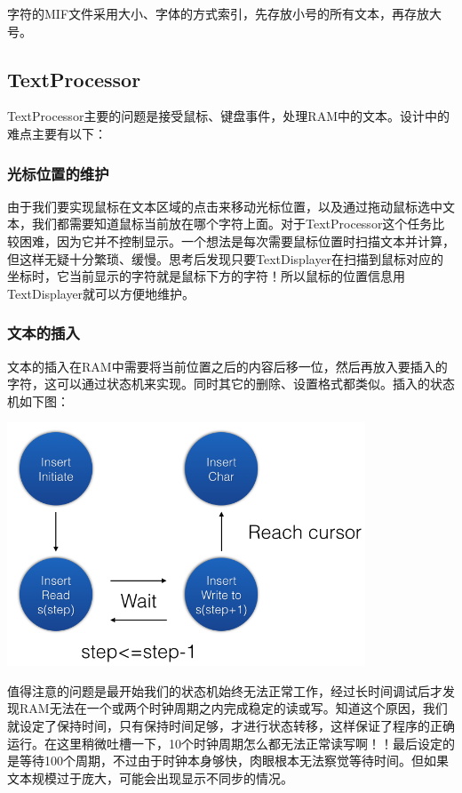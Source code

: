 \documentclass[12pt,a4paper]{article}
\begin{document}
字符的MIF文件采用大小、字体的方式索引，先存放小号的所有文本，再存放大号。


\subsection{TextProcessor}
TextProcessor主要的问题是接受鼠标、键盘事件，处理RAM中的文本。设计中的难点主要有以下：

\subsubsection{光标位置的维护}
由于我们要实现鼠标在文本区域的点击来移动光标位置，以及通过拖动鼠标选中文本，我们都需要知道鼠标当前放在哪个字符上面。对于TextProcessor这个任务比较困难，因为它并不控制显示。一个想法是每次需要鼠标位置时扫描文本并计算，但这样无疑十分繁琐、缓慢。思考后发现只要TextDisplayer在扫描到鼠标对应的坐标时，它当前显示的字符就是鼠标下方的字符！所以鼠标的位置信息用TextDisplayer就可以方便地维护。

\subsubsection{文本的插入}
文本的插入在RAM中需要将当前位置之后的内容后移一位，然后再放入要插入的字符，这可以通过状态机来实现。同时其它的删除、设置格式都类似。插入的状态机如下图：

\includegraphics[width=0.8\textwidth]{wordpad2.png}

值得注意的问题是最开始我们的状态机始终无法正常工作，经过长时间调试后才发现RAM无法在一个或两个时钟周期之内完成稳定的读或写。知道这个原因，我们就设定了保持时间，只有保持时间足够，才进行状态转移，这样保证了程序的正确运行。在这里稍微吐槽一下，10个时钟周期怎么都无法正常读写啊！！最后设定的是等待100个周期，不过由于时钟本身够快，肉眼根本无法察觉等待时间。但如果文本规模过于庞大，可能会出现显示不同步的情况。
\end{document}
